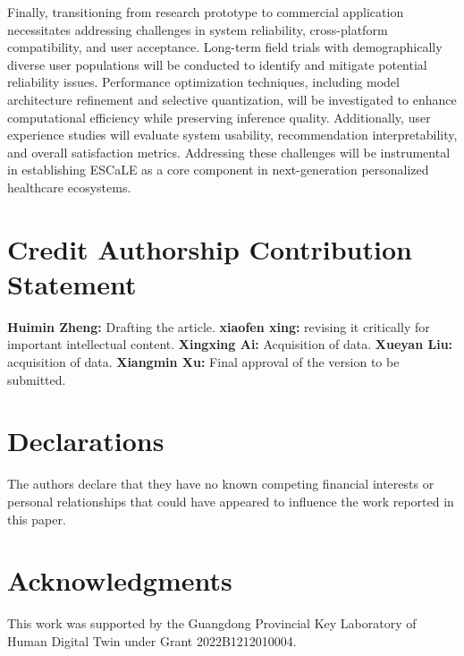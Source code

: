 \documentclass[preprint,12pt]{elsarticle}
\begin{document}
Finally, transitioning from research prototype to commercial application necessitates addressing challenges in system reliability, cross-platform compatibility, and user acceptance. Long-term field trials with demographically diverse user populations will be conducted to identify and mitigate potential reliability issues. Performance optimization techniques, including model architecture refinement and selective quantization, will be investigated to enhance computational efficiency while preserving inference quality. Additionally, user experience studies will evaluate system usability, recommendation interpretability, and overall satisfaction metrics. Addressing these challenges will be instrumental in establishing ESCaLE as a core component in next-generation personalized healthcare ecosystems.


\section*{Credit Authorship Contribution Statement}
\noindent 
\textbf {Huimin Zheng:} Drafting the article. 
\textbf {xiaofen xing:} revising it critically for important intellectual content. 
\textbf {Xingxing Ai:}  Acquisition of data.
\textbf {Xueyan Liu:}  acquisition of data. 
\textbf{Xiangmin Xu:} Final approval of the version to be submitted.

\section*{Declarations}
\noindent The authors declare that they have no known competing financial interests or personal relationships that could have appeared to influence the work reported in this paper.

\section*{Acknowledgments}
\noindent This work was supported by the Guangdong Provincial Key Laboratory of Human Digital Twin under Grant 2022B1212010004.

\appendix
\end{document}
